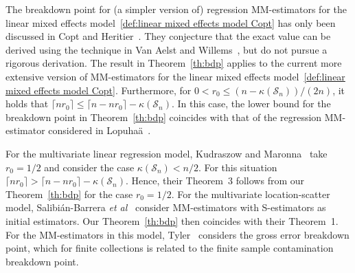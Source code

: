 \documentclass{article}
\numberwithin{equation}{section}
\theoremstyle{plain}
\begin{document}
The breakdown point for (a simpler version of) regression MM-estimators for the
linear mixed effects model~\eqref{def:linear mixed effects model Copt} 
has only been discussed in Copt and Heritier~\cite{copt&heritier2007}.
They conjecture that the exact value can be derived using the technique in
Van Aelst and Willems~\cite{vanaelst&willems2005}, but do not pursue a rigorous derivation.
The result in Theorem~\ref{th:bdp} applies to the current more extensive version of MM-estimators 
for the linear mixed effects model~\eqref{def:linear mixed effects model Copt}.
Furthermore, for $0<r_0\leq (n-\kappa(\mathcal{S}_n))/(2n)$, it holds that 
$\lceil nr_0\rceil\leq \lceil n-nr_0\rceil-\kappa(\mathcal{S}_n)$.
In this case, the lower bound for the breakdown point in Theorem~\ref{th:bdp}
coincides with that of the regression MM-estimator considered in Lopuha\"a~\cite{lopuhaa2023}.

For the multivariate linear regression model,
Kudraszow and Maronna~\cite{kudraszow-maronna2011} take $r_0=1/2$ and consider the case $\kappa(\mathcal{S}_n)<n/2$.
For this situation $\lceil nr_0\rceil>\lceil n-nr_0\rceil-\kappa(\mathcal{S}_n)$.
Hence, their Theorem~3 follows from our Theorem~\ref{th:bdp} for the case $r_0=1/2$.
For the multivariate location-scatter model, Salibi\'an-Barrera \emph{et al}~\cite{SalibianBarrera-VanAelst-Willems2006}
consider MM-estimators with S-estimators as initial estimators.
Our Theorem~\ref{th:bdp} then coincides with their Theorem~1.
For the MM-estimators in this model, Tyler~\cite{tyler2002} considers the gross error breakdown point,
which for finite collections is related to the finite sample contamination breakdown point.
\end{document}
